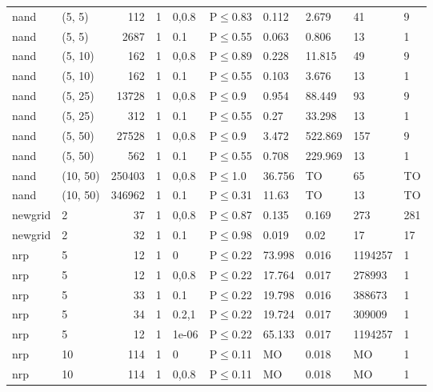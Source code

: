 \begin{longtable}{llrrllllll}
 nand          & (5, 5)   &    	112 & 1 & 0,0.8 & P$\leq$0.83  & 0.112  & 2.679   & 41      & 9    \\
 nand          & (5, 5)   &   	2687 & 1 & 0.1   & P$\leq$0.55  & 0.063  & 0.806   & 13      & 1    \\
 nand          & (5, 10)  &    	162 & 1 & 0,0.8 & P$\leq$0.89  & 0.228  & 11.815  & 49      & 9    \\
 nand          & (5, 10)  &    	162 & 1 & 0.1   & P$\leq$0.55  & 0.103  & 3.676   & 13      & 1    \\
 nand          & (5, 25)  &  	13728 & 1 & 0,0.8 & P$\leq$0.9   & 0.954  & 88.449  & 93      & 9    \\
 nand          & (5, 25)  &    	312 & 1 & 0.1   & P$\leq$0.55  & 0.27   & 33.298  & 13      & 1    \\
 nand          & (5, 50)  &  	27528 & 1 & 0,0.8 & P$\leq$0.9   & 3.472  & 522.869 & 157     & 9    \\
 nand          & (5, 50)  &    	562 & 1 & 0.1   & P$\leq$0.55  & 0.708  & 229.969 & 13      & 1    \\
 nand          & (10, 50) & 	250403 & 1 & 0,0.8 & P$\leq$1.0   & 36.756 & TO      & 65      & TO   \\
 nand          & (10, 50) & 	346962 & 1 & 0.1   & P$\leq$0.31  & 11.63  & TO      & 13      & TO   \\
 newgrid       & 2        &     	37 & 1 & 0,0.8 & P$\leq$0.87  & 0.135  & 0.169   & 273     & 281  \\
 newgrid       & 2        &     	32 & 1 & 0.1   & P$\leq$0.98  & 0.019  & 0.02    & 17      & 17   \\
 nrp           & 5        &     	12 & 1 & 0     & P$\leq$0.22  & 73.998 & 0.016   & 1194257 & 1    \\
 nrp           & 5        &     	12 & 1 & 0,0.8 & P$\leq$0.22  & 17.764 & 0.017   & 278993  & 1    \\
 nrp           & 5        &     	33 & 1 & 0.1   & P$\leq$0.22  & 19.798 & 0.016   & 388673  & 1    \\
 nrp           & 5        &     	34 & 1 & 0.2,1 & P$\leq$0.22  & 19.724 & 0.017   & 309009  & 1    \\
 nrp           & 5        &     	12 & 1 & 1e-06 & P$\leq$0.22  & 65.133 & 0.017   & 1194257 & 1    \\
 nrp           & 10       &    	114 & 1 & 0     & P$\leq$0.11  & MO     & 0.018   & MO      & 1    \\
 nrp           & 10       &    	114 & 1 & 0,0.8 & P$\leq$0.11  & MO     & 0.018   & MO      & 1    \\

\end{longtable}
